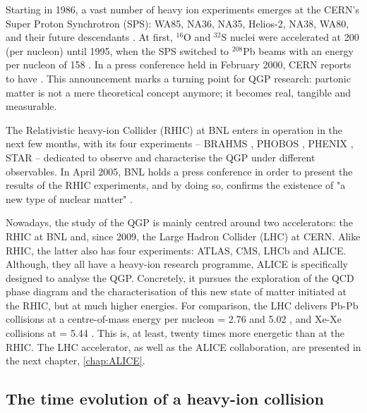 Starting in 1986, a vast number of heavy ion experiments emerges at the CERN's Super Proton Synchrotron (SPS): WA85, NA36, NA35, Helios-2, NA38, WA80, and their future descendants \cite{satzSPSHeavyIon2004}. At first, $^{16}$O and $^{32}$S nuclei were accelerated at 200 \gev (per nucleon) until 1995, when the SPS switched to $^{208}$Pb beams with an energy per nucleon of 158 \gev. In a press conference held in February 2000, CERN reports to have  \cite{NewStateMatter2023}. This announcement marks a turning point for QGP research: partonic matter is not a mere theoretical concept anymore; it becomes real, tangible and measurable. 

The Relativistic heavy-ion Collider (RHIC) at BNL enters in operation in the next few months, with its four experiments -- BRAHMS \cite{arseneQuarkGluonPlasma2005}, PHOBOS \cite{alPHOBOSPerspectiveDiscoveries2005}, PHENIX \cite{phenixcollaborationFormationDensePartonic2005}, STAR \cite{starcollaborationExperimentalTheoreticalChallenges2005} -- dedicated to observe and characterise the QGP under different observables. In April 2005, BNL holds a press conference in order to present the results of the RHIC experiments, and by doing so, confirms the existence of "a new type of nuclear matter" \cite{ludlamHUNTINGQUARKGLUON2005}.

Nowadays, the study of the QGP is mainly centred around two accelerators: the RHIC at BNL and, since 2009, the Large Hadron Collider (LHC) at CERN. Alike RHIC, the latter also has four experiments: ATLAS, CMS, LHCb and ALICE. Although, they all have a heavy-ion research programme, ALICE is specifically designed to analyse the QGP. Concretely, it pursues the exploration of the QCD phase diagram and the characterisation of this new state of matter initiated at the RHIC, but at much higher energies. For comparison, the LHC delivers Pb-Pb collisions at a centre-of-mass energy per nucleon \sqrtSnn = 2.76 and 5.02 \tev, and Xe-Xe collisions at \sqrtSnn = 5.44 \tev. This is, at least, twenty times more energetic than at the RHIC. The LHC accelerator, as well as the ALICE collaboration, are presented in the next chapter, \chap\ref{chap:ALICE}. 


\subsection{The time evolution of a heavy-ion collision}
\label{subsec:BjorkenScenario}

